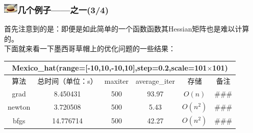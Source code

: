 \documentclass{beamer}
\begin{document}
\begin{frame}
\frametitle{\includegraphics[width=7mm,height=5mm]{Images/strawhat.jpg}几个例子——之一(3/4)}
首先注意到的是：即便是如此简单的一个函数函数其Hessian矩阵也是难以计算的。\\
下面就来看一下墨西哥草帽上的优化问题的一些结果：
\vspace{-3mm}
\begin{table}[h]
\centering
\begin{tabular}{|c|c|c|c|c|c|}\hline
\multicolumn{6}{|c|}{Mexico\_hat(range=[-10,10,-10,10],step=0.2,scale=101$\times$101)} \\\hline
算法 &总时间（单位：s） &maxiter &average\_iter &存储 &备注\\ \hline
grad &8.450431 &500 &93.97 &$O(n)$ &\#\#\#\\ \hline
newton &3.720508 &500 &5.43 &$O(n^2)$ &\#\#\#\\ \hline
bfgs &14.776714 &500 &42.27 &$O(n^2)$ &\#\#\#\\ \hline
\end{tabular}
\label{exp_1}
\end{table}
\end{frame}
\end{document}
